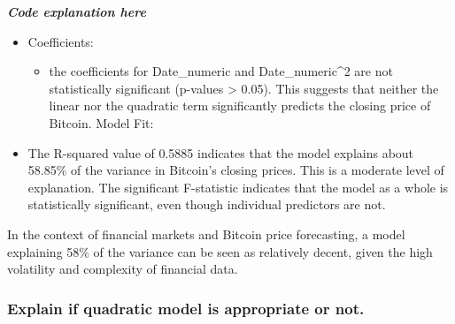 \documentclass[
]{book}
\providecommand{\tightlist}{%
  \setlength{\itemsep}{0pt}\setlength{\parskip}{0pt}}
\begin{document}
\emph{\textbf{Code explanation here}}

\begin{itemize}
\tightlist
\item
  Coefficients:

  \begin{itemize}
  \tightlist
  \item
    the coefficients for Date\_numeric and Date\_numeric\^{}2 are not statistically significant (p-values \textgreater{} 0.05). This suggests that neither the linear nor the quadratic term significantly predicts the closing price of Bitcoin.
    Model Fit:
  \end{itemize}
\item
  The R-squared value of 0.5885 indicates that the model explains about 58.85\% of the variance in Bitcoin's closing prices. This is a moderate level of explanation.
  The significant F-statistic indicates that the model as a whole is statistically significant, even though individual predictors are not.
\end{itemize}

In the context of financial markets and Bitcoin price forecasting, a model explaining 58\% of the variance can be seen as relatively decent, given the high volatility and complexity of financial data.

\subsubsection{Explain if quadratic model is appropriate or not.}\label{explain-if-quadratic-model-is-appropriate-or-not.}
\end{document}
